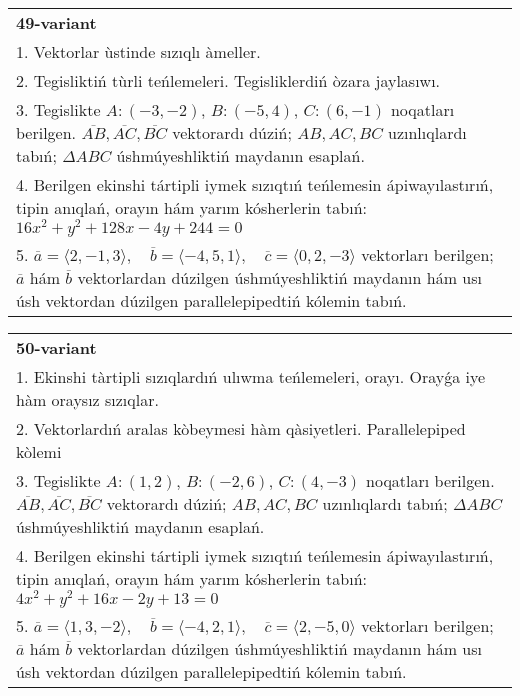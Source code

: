 \documentclass{article}
\begin{document}
\begin{tabular}{m{17cm}}
\textbf{49-variant}\\
1. Vektorlar ùstinde sızıqlı àmeller.\\

2. Tegisliktiń tùrli teńlemeleri. Tegisliklerdiń òzara jaylasıwı.\\

3. Tegislikte $A: (-3, -2)$, $B: (-5, 4)$, $C: (6, -1)$ noqatları berilgen. $\overline{AB}, \overline{AC}, \overline{BC}$ vektorardı dúziń; $AB, AC, BC$ uzınlıqlardı tabıń; $\Delta ABC$ úshmúyeshliktiń maydanın esaplań. \\

4. Berilgen ekinshi tártipli iymek sızıqtıń teńlemesin ápiwayılastırıń, tipin anıqlań, orayın hám yarım kósherlerin tabıń: $16x^2+y^2+128x-4y+244=0$\\

5. \(\overline{a} = \langle 2, -1, 3 \rangle, \quad \overline{b} = \langle -4, 5, 1 \rangle, \quad \overline{c} = \langle 0, 2, -3 \rangle\) vektorları berilgen; \(\overline{a}\) hám \(\overline{b}\) vektorlardan dúzilgen úshmúyeshliktiń maydanın hám usı úsh vektordan dúzilgen parallelepipedtiń kólemin tabıń.
\end{tabular}
\vspace{1cm}


\begin{tabular}{m{17cm}}
\textbf{50-variant}\\
1. Ekinshi tàrtipli sızıqlardıń ulıwma teńlemeleri, orayı. Orayǵa iye hàm oraysız sızıqlar.\\

2. Vektorlardıń aralas kòbeymesi hàm qàsiyetleri. Parallelepiped kòlemi\\

3. Tegislikte $A: (1, 2)$, $B: (-2, 6)$, $C: (4, -3)$ noqatları berilgen. $\overline{AB}, \overline{AC}, \overline{BC}$ vektorardı dúziń; $AB, AC, BC$ uzınlıqlardı tabıń; $\Delta ABC$ úshmúyeshliktiń maydanın esaplań. \\

4. Berilgen ekinshi tártipli iymek sızıqtıń teńlemesin ápiwayılastırıń, tipin anıqlań, orayın hám yarım kósherlerin tabıń: $4x^2+y^2+16x-2y+13=0$\\

5. \(\overline{a} = \langle 1, 3, -2 \rangle, \quad \overline{b} = \langle -4, 2, 1 \rangle, \quad \overline{c} = \langle 2, -5, 0 \rangle\) vektorları berilgen; \(\overline{a}\) hám \(\overline{b}\) vektorlardan dúzilgen úshmúyeshliktiń maydanın hám usı úsh vektordan dúzilgen parallelepipedtiń kólemin tabıń.
\end{tabular}
\vspace{1cm}
\end{document}

